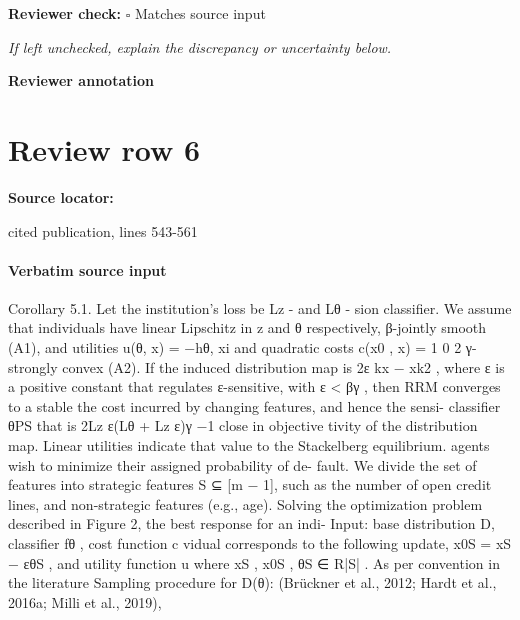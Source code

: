 \documentclass[10pt]{article}
\newcommand{\reviewerbox}{%
  \par\noindent\fbox{\parbox{0.96\linewidth}{\rule{0pt}{0.38in}}}\par
}
\newcommand{\reviewmatch}[1]{%
  \par\noindent\textbf{Reviewer check:} $\square$\; #1\par
  \noindent\emph{If left unchecked, explain the discrepancy or uncertainty below.}\par
}
\begin{document}
\reviewmatch{Matches source input}
\noindent\textbf{Reviewer annotation}\par
\reviewerbox
\clearpage
\hypertarget{source-claim-a22662c7824bd286}{}
\section*{Review row 6}
\textbf{Source locator:} {\footnotesize\raggedright cited publication, lines 543-\allowbreak{}561\par}
\paragraph{Verbatim source input}
\begin{ReviewVerbatim}
Corollary 5.1. Let the institution’s loss be Lz - and Lθ -                      sion classiﬁer. We assume that individuals have linear
Lipschitz in z and θ respectively, β-jointly smooth (A1), and                   utilities u(θ, x) = −hθ, xi and quadratic costs c(x0 , x) =
                                                                                 1     0     2
γ-strongly convex (A2). If the induced distribution map is                      2ε kx − xk2 , where ε is a positive constant that regulates
ε-sensitive, with ε < βγ , then RRM converges to a stable                       the cost incurred by changing features, and hence the sensi-
classiﬁer θPS that is 2Lz ε(Lθ + Lz ε)γ −1 close in objective                   tivity of the distribution map. Linear utilities indicate that
value to the Stackelberg equilibrium.                                           agents wish to minimize their assigned probability of de-
                                                                                fault. We divide the set of features into strategic features
                                                                                S ⊆ [m − 1], such as the number of open credit lines, and
                                                                                non-strategic features (e.g., age). Solving the optimization
                                                                                problem described in Figure 2, the best response for an indi-
 Input: base distribution D, classiﬁer fθ , cost function c                     vidual corresponds to the following update, x0S = xS − εθS ,
 and utility function u                                                         where xS , x0S , θS ∈ R|S| . As per convention in the literature
 Sampling procedure for D(θ):                                                   (Brückner et al., 2012; Hardt et al., 2016a; Milli et al., 2019),

\end{ReviewVerbatim}
\end{document}

